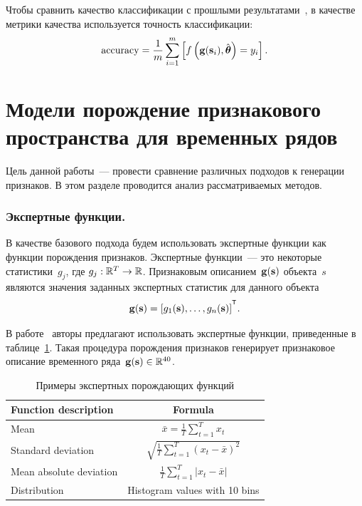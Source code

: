 Чтобы сравнить качество классификации с прошлыми результатами~\cite{karasikov2016feature,ivkin2015ts}, в качестве метрики качества используется точность классификации:
\begin{equation}
	\mathrm{accuracy} = \frac{1}{m} \sum_{i=1}^{m} \left[f\left(\mathbf{g}(\mathbf{s}_i), \hat{\boldsymbol{\theta}} \right)= y_i\right].
	\label{ch6:eq:accuracy}
\end{equation}

\section{Модели порождение признакового пространства для временных рядов}
\label{sec:ch6:feature_generation_models}

Цель данной работы~--- провести сравнение различных подходов к генерации признаков.
В этом разделе проводится анализ рассматриваемых методов.

\subsubsection{Экспертные функции.}
В качестве базового подхода будем использовать экспертные функции как функции порождения признаков.
Экспертные функции~--- это некоторые статистики~$g_j$, где $g_j: \mathbb{R}^T \rightarrow \mathbb{R}$.
Признаковым описанием~$\mathbf{g}(\mathbf{s})$ объекта~$s$ являются значения заданных экспертных статистик для данного объекта
\[
	\mathbf{g}(\bs) = [g_1(\bs), \dots, g_n(\bs)]^{\T}.
\]

В работе~\cite{kwapisz2011activity} авторы предлагают использовать экспертные функции, приведенные в таблице~\ref{ch6:tbl:expert_functions}.
Такая процедура порождения признаков генерирует признаковое описание временного ряда~$\mathbf{g}(\mathbf{s}) \in \mathbb{R}^{40}$.

\begin{table}[ht]
	\centering
	\caption{Примеры экспертных порождающих функций}
	\begin{tabular}{|l|c|}
		\hline
		\textbf{Function description}    & \textbf{Formula} \\ \hline
		Mean                    & $\bar{x} = \frac{1}{T} \sum_{t=1}^{T} x_t$    \\ \hline
		Standard deviation      & $\sqrt{\frac{1}{T} \sum_{t=1}^{T} (x_t - \bar{x})^2}$    \\ \hline
		Mean absolute deviation & $\frac{1}{T} \sum_{t=1}^{T} |x_t - \bar{x}|$    \\ \hline
		Distribution            &  Histogram values with 10 bins    \\ \hline
	\end{tabular}
	\label{ch6:tbl:expert_functions}
\end{table}

